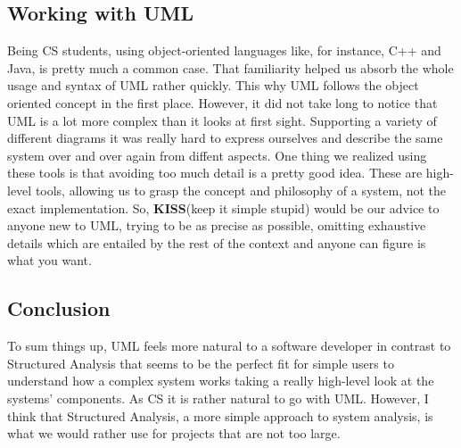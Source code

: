 \documentclass{article}
\begin{document}
\subsection{Working with UML}
Being CS students, using object-oriented languages like, for instance, C++ and Java, is pretty much a common case.
That familiarity helped us absorb the whole usage and syntax of UML rather quickly. This why UML follows the
object oriented concept in the first place. However, it did not take long to notice that UML is a lot more
complex than it looks at first sight. Supporting a variety of different diagrams it was really hard to
express ourselves and describe the same system over and over again from diffent aspects.
One thing we realized using these tools is that avoiding too much detail is a
pretty good idea. These are high-level tools, allowing us to grasp the concept and philosophy of a system, not
the exact implementation. So, \textbf{KISS}(keep it simple stupid) would be our advice to anyone new to UML,
trying to be as precise as possible, omitting exhaustive details which are entailed by the rest of the context
and anyone can figure is what you want. 
 

\subsection{Conclusion}
To sum things up, UML feels more natural to a software developer in contrast to Structured Analysis that seems
to be the perfect fit for simple users to understand how a complex system works taking a really high-level look
at the systems' components. As CS it is rather natural to go with UML. However, I think that Structured Analysis,
a more simple approach to system analysis, is what we would rather use for projects that are not too large.
\end{document}
